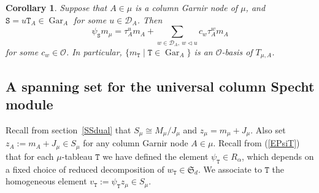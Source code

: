\documentclass[twoside,11pt,reqno]{amsart}
\numberwithin{equation}{section}
\newtheorem{Corollary}[equation]{Corollary}
\theoremstyle{definition}  %
\def\bi{\text{\boldmath$i$}}
\def\bj{\text{\boldmath$j$}}
\def\bs{\text{\boldmath$s$}}
\newcommand{\res}{\operatorname{res}}
\newcommand{\Stab}{\operatorname{Stab}}
\newcommand{\0}{{\bar 0}}
\newcommand{\1}{{\bar 1}}
\newcommand{\al}{\alpha}
\def\Si{\mathfrak{S}}
\newcommand{\si}{\sigma}
\newcommand{\de}{\delta}
\newcommand{\D}{{\mathscr D}}
\newcommand\Par[1][]{{\mathscr P}^{\kappa#1}}
\def\T{{\mathtt T}}
\def\Stab{{\mathtt S}}
\def\height{{\operatorname{ht}}}
\def\Gar{{\operatorname{Gar}}}
\def\into{{\hookrightarrow}}
\renewcommand\O{\mathcal O}
\begin{document}
%



\begin{Corollary} \label{signed C8910}%
Suppose that %
$A\in\mu$ is a column Garnir node of $\mu$, and $\Stab=u\T_A\in\Gar_A$ for some $u\in\D_A$. %
Then
$$
\psi_\Stab m_\mu=\tau^u_A m_A+\sum_{w\in\D_A,\ w\lhd u} c_w\tau^w_Am_A
$$
for some $c_w\in\O$. In particular, $\{m_\T \mid \T\in\Gar_A\}$  
is an $\O$-basis of $T_{\mu,A}$.
\end{Corollary}

\subsection{A spanning set for the universal column Specht module}
Recall from section~\ref{SSdual}
that $S_\mu\cong M_\mu/J_\mu$ and $z_\mu=m_\mu+J_\mu$. Also set 
$z_A:=m_A+J_\mu\in S_\mu$
for any column Garnir node $A\in\mu$. 
Recall from (\ref{EPsiT}) that for each $\mu$-tableau $\T$ we have defined the element $\psi_\T\in R_\al$,
which depends on a fixed choice of reduced decomposition of $w_\T\in\Si_d$. We associate to $\T$ the
homogeneous element $v_\T:=\psi_\T z_\mu \in S_\mu$.
\end{document}
